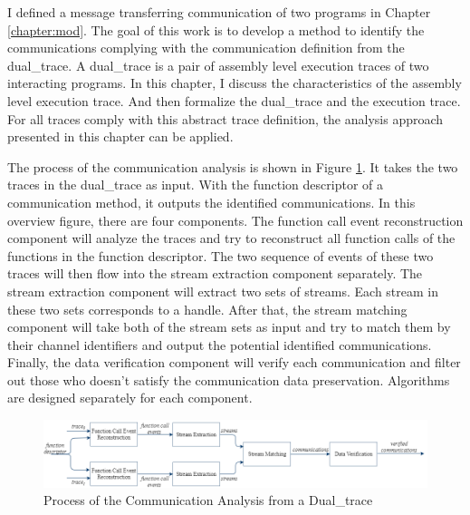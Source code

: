 


\label{chapter:alo}
I defined a message transferring communication of two programs in Chapter \ref{chapter:mod}. The goal of this work is to develop a method to identify the communications complying with the communication definition from the dual\_trace. A dual\_trace is a pair of assembly level execution traces of two interacting programs. In this chapter, I discuss the characteristics of the assembly level execution trace. And then formalize the dual\_trace and the execution trace. For all traces comply with this abstract trace definition, the analysis approach presented in this chapter can be applied.

The process of the communication analysis is shown in Figure \ref{overview}. It takes the two traces in the dual\_trace as input. With the function descriptor of a communication method, it outputs the identified communications. In this overview figure, there are four components. The function call event reconstruction component will analyze the traces and try to reconstruct all function calls of the functions in the function descriptor. The two sequence of events of these two traces will then flow into the stream extraction component separately. The stream extraction component will extract two sets of streams. Each stream in these two sets corresponds to a handle. After that, the stream matching component will take both of the stream sets as input and try to match them by their channel identifiers and output the potential identified communications. Finally, the data verification component will verify each communication and filter out those who doesn't satisfy the communication data preservation. Algorithms are designed separately for each component.

\begin{figure}[H]
\centerline{\includegraphics[scale=0.55]{Figures/overview}}
\caption{Process of the Communication Analysis from a Dual\_trace}
\label{overview}
\end{figure}

